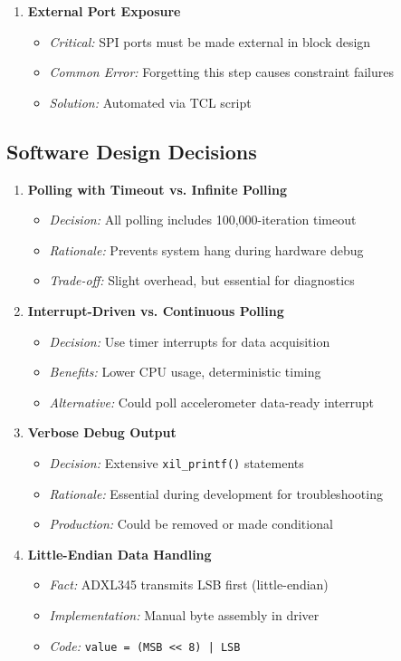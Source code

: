 \documentclass[11pt,a4paper]{article}
\begin{document}
\begin{enumerate}
    \item \textbf{External Port Exposure}
    \begin{itemize}
        \item \textit{Critical:} SPI ports must be made external in block design
        \item \textit{Common Error:} Forgetting this step causes constraint failures
        \item \textit{Solution:} Automated via TCL script
    \end{itemize}
\end{enumerate}

\subsection{Software Design Decisions}

\begin{enumerate}
    \item \textbf{Polling with Timeout vs. Infinite Polling}
    \begin{itemize}
        \item \textit{Decision:} All polling includes 100,000-iteration timeout
        \item \textit{Rationale:} Prevents system hang during hardware debug
        \item \textit{Trade-off:} Slight overhead, but essential for diagnostics
    \end{itemize}

    \item \textbf{Interrupt-Driven vs. Continuous Polling}
    \begin{itemize}
        \item \textit{Decision:} Use timer interrupts for data acquisition
        \item \textit{Benefits:} Lower CPU usage, deterministic timing
        \item \textit{Alternative:} Could poll accelerometer data-ready interrupt
    \end{itemize}

    \item \textbf{Verbose Debug Output}
    \begin{itemize}
        \item \textit{Decision:} Extensive \texttt{xil\_printf()} statements
        \item \textit{Rationale:} Essential during development for troubleshooting
        \item \textit{Production:} Could be removed or made conditional
    \end{itemize}

    \item \textbf{Little-Endian Data Handling}
    \begin{itemize}
        \item \textit{Fact:} ADXL345 transmits LSB first (little-endian)
        \item \textit{Implementation:} Manual byte assembly in driver
        \item \textit{Code:} \texttt{value = (MSB << 8) | LSB}
    \end{itemize}
\end{enumerate}
\end{document}
